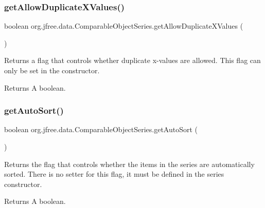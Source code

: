 \subsubsection{\texorpdfstring{get\+Allow\+Duplicate\+X\+Values()}{getAllowDuplicateXValues()}}
{\footnotesize\ttfamily boolean org.\+jfree.\+data.\+Comparable\+Object\+Series.\+get\+Allow\+Duplicate\+X\+Values (\begin{DoxyParamCaption}{ }\end{DoxyParamCaption})}

Returns a flag that controls whether duplicate x-\/values are allowed. This flag can only be set in the constructor.

\begin{DoxyReturn}{Returns}
A boolean. 
\end{DoxyReturn}
\mbox{\label{classorg_1_1jfree_1_1data_1_1_comparable_object_series_a7c35e4a07051869a7b2e5949b5c69882}} 
\subsubsection{\texorpdfstring{get\+Auto\+Sort()}{getAutoSort()}}
{\footnotesize\ttfamily boolean org.\+jfree.\+data.\+Comparable\+Object\+Series.\+get\+Auto\+Sort (\begin{DoxyParamCaption}{ }\end{DoxyParamCaption})}

Returns the flag that controls whether the items in the series are automatically sorted. There is no setter for this flag, it must be defined in the series constructor.

\begin{DoxyReturn}{Returns}
A boolean. 
\end{DoxyReturn}
\mbox{\label{classorg_1_1jfree_1_1data_1_1_comparable_object_series_a76ff978830bd64e64f89c6656b5a40f7}} 
